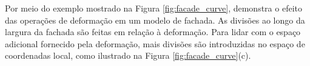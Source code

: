 \begin{figure}[h!]
	\centering
	\captionsetup{width=15cm}
	{}	
\end{figure}

\newpage

Por meio do exemplo mostrado na Figura \ref{fig:facade_curve},  demonstra o efeito das operações de deformação em um modelo de fachada. As divisões ao longo da largura da fachada são feitas em relação à deformação. Para lidar com o espaço adicional fornecido pela deformação, mais divisões são introduzidas no espaço de coordenadas local, como ilustrado na Figura \ref{fig:facade_curve}(c).

